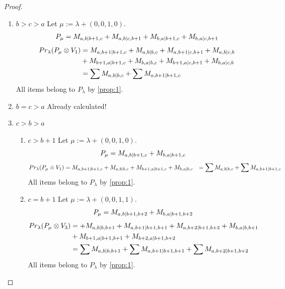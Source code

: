 \documentclass[12pt,a4paper]{article}
\begin{document}
\begin{proof}
\begin{enumerate}
\item $b>c>a$
        Let $\mu:=\lambda + (0,0,1,0) $. 
\begin{equation}\notag
  \begin{aligned}
      P_{\mu} =
M_{a,b|b+1,c}
+M_{a,b|c,b+1}
+M_{b,a|b+1,c}
+M_{b,a|c,b+1}
  \end{aligned}
\end{equation}
\begin{equation}\notag
  \begin{aligned}
  Pr_{\lambda}(P_\mu \otimes V_1) &=
M_{a,b+1|b+1,c}
+M_{a,b|b,c}
+M_{a,b+1|c,b+1}
+M_{a,b|c,b} \\
                                  &+
M_{b+1,a|b+1,c}
+M_{b,a|b,c}
+M_{b+1,a|c,b+1}
+M_{b,a|c,b} \\
                                  &=
\sum M_{a,b|b,c}
+\sum M_{a,b+1|b+1,c}
  \end{aligned}
\end{equation}
All items belong to $P_\lambda$ by \cref{prop:1}.
  
\item $b=c>a$ Already calculated!

\item $c>b>a$
  \begin{enumerate}
    \item $c>b+1$
        Let $\mu:=\lambda + (0,0,1,0) $. 
\begin{equation}\notag
  \begin{aligned}
      P_{\mu} =
M_{a,b|b+1,c}
+M_{b,a|b+1,c}
  \end{aligned}
\end{equation}
\begin{equation}\notag
  \begin{aligned}
  Pr_{\lambda}(P_\mu \otimes V_1) &=
M_{a,b+1|b+1,c}
+M_{a,b|b,c}
+M_{b+1,a|b+1,c}
+M_{b,a|b,c}
                                  &=
\sum M_{a,b|b,c}
+\sum M_{a,b+1|b+1,c}
  \end{aligned}
\end{equation}
All items belong to $P_\lambda$ by \cref{prop:1}.

    \item $c=b+1$
        Let $\mu:=\lambda + (0,0,1,1) $. 
\begin{equation}\notag
  \begin{aligned}
      P_{\mu} =
M_{a,b|b+1,b+2}
+M_{b,a|b+1,b+2}
  \end{aligned}
\end{equation}
\begin{equation}\notag
  \begin{aligned}
  Pr_{\lambda}(P_\mu \otimes V_3) &=
+M_{a,b|b,b+1}
+M_{a,b+1|b+1,b+1}
+M_{a,b+2|b+1,b+2}
+M_{b,a|b,b+1} \\
                                  &+
M_{b+1,a|b+1,b+1}
+M_{b+2,a|b+1,b+2} \\
                                  &=
\sum M_{a,b|b,b+1}
+\sum M_{a,b+1|b+1,b+1}
+\sum M_{a,b+2|b+1,b+2}
  \end{aligned}
\end{equation}
All items belong to $P_\lambda$ by \cref{prop:1}.
  \end{enumerate}


\end{enumerate}
\end{proof}
\end{document}
